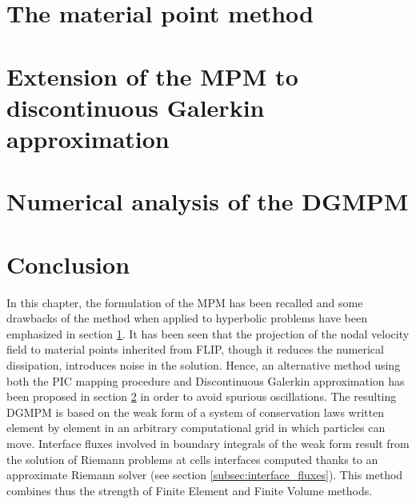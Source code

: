\section{The material point method}
\label{sec:MPM}


\section{Extension of the MPM to discontinuous Galerkin approximation}
\label{sec:DGMPM}


\section{Numerical analysis of the DGMPM}
\label{sec:DGMPM_analysis}


\section{Conclusion}
In this chapter, the formulation of the MPM has been recalled and some drawbacks of the method when applied to hyperbolic problems have been emphasized in section \ref{sec:MPM}.
It has been seen that the projection of the nodal velocity field to material points inherited from FLIP, though it reduces the numerical dissipation, introduces noise in the solution.
Hence, an alternative method using both the PIC mapping procedure and Discontinuous Galerkin approximation has been proposed in section \ref{sec:DGMPM} in order to avoid spurious oscillations.
The resulting DGMPM is based on the weak form of a system of conservation laws written element by element in an arbitrary computational grid in which particles can move.
Interface fluxes involved in boundary integrals of the weak form result from the solution of Riemann problems at cells interfaces computed thanks to an approximate Riemann solver (see section \ref{subsec:interface_fluxes}).
This method combines thus the strength of Finite Element and Finite Volume methods.


